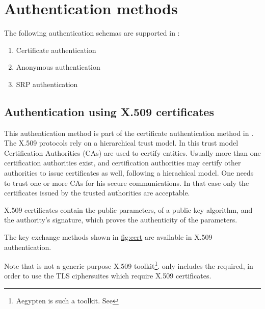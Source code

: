 \chapter{Authentication methods}
\par
The following authentication schemas are supported in \gnutls:
\begin{enumerate}
 \item Certificate authentication
 \item Anonymous authentication
 \item SRP authentication
\end{enumerate}

\section{Authentication using X.509 certificates}
This authentication method is part of the certificate authentication
method in \gnutls{}.
The X.509 protocols rely on a hierarchical trust model. In this trust model
Certification Authorities (CAs) are used to certify entities.
Usually more than one certification authorities exist, and certification
authorities may certify other authorities to issue certificates as well,
following a hierachical model. 
One needs to trust one or more CAs for his secure
communications. In that case only the certificates issued by the trusted
authorities are acceptable. 
\par
X.509 certificates contain the public parameters, 
of a public key algorithm, and the authority's signature, which proves the
authenticity of the parameters.
\par
The key exchange methods shown in \hyperref{figure}{figure }{}{fig:cert} are
available in X.509 authentication. 

\par
Note that \gnutls{} is not a generic purpose X.509 toolkit\footnote{Aegypten is such a toolkit. See 
}. 
\gnutls{} only includes the required,
in order to use the TLS ciphersuites which require X.509 certificates.

